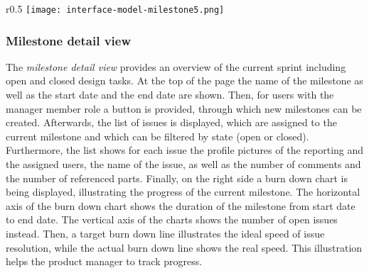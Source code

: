 \begin{wrapfigure}{r}{0.5\textwidth}
    \centering
    \texttt{[image: interface-model-milestone5.png]}
    \label{fig:screenshot-milestone}
\end{wrapfigure}

\subsubsection{Milestone detail view}

The \textit{milestone detail view} provides an overview of the current sprint including open and closed design tasks.
At the top of the page the name of the milestone as well as the start date and the end date are shown.
Then, for users with the manager member role a button is provided, through which new milestones can be created.
Afterwards, the list of issues is displayed, which are assigned to the current milestone and which can be filtered by state (open or closed).
Furthermore, the list shows for each issue the profile pictures of the reporting and the assigned users, the name of the issue, as well as the number of comments and the number of referenced parts.
Finally, on the right side a burn down chart is being displayed, illustrating the progress of the current milestone.
The horizontal axis of the burn down chart shows the duration of the milestone from start date to end date.
The vertical axis of the charts shows the number of open issues instead.
Then, a target burn down line illustrates the ideal speed of issue resolution, while the actual burn down line shows the real speed.
This illustration helps the product manager to track progress.